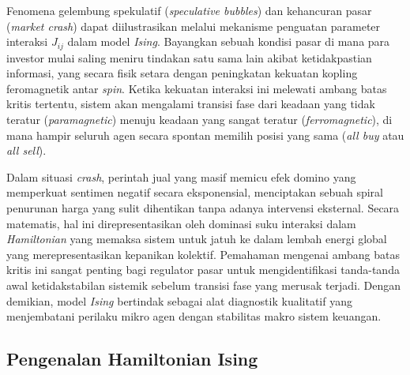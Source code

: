 \begin{example}
    Fenomena gelembung spekulatif (\textit{speculative bubbles}) dan kehancuran pasar (\textit{market crash}) dapat diilustrasikan melalui mekanisme penguatan parameter interaksi $J_{ij}$ dalam model \textit{Ising}. Bayangkan sebuah kondisi pasar di mana para investor mulai saling meniru tindakan satu sama lain akibat ketidakpastian informasi, yang secara fisik setara dengan peningkatan kekuatan kopling feromagnetik antar \textit{spin}. Ketika kekuatan interaksi ini melewati ambang batas kritis tertentu, sistem akan mengalami transisi fase dari keadaan yang tidak teratur (\textit{paramagnetic}) menuju keadaan yang sangat teratur (\textit{ferromagnetic}), di mana hampir seluruh agen secara spontan memilih posisi yang sama (\textit{all buy} atau \textit{all sell}).

    Dalam situasi \textit{crash}, perintah jual yang masif memicu efek domino yang memperkuat sentimen negatif secara eksponensial, menciptakan sebuah spiral penurunan harga yang sulit dihentikan tanpa adanya intervensi eksternal. Secara matematis, hal ini direpresentasikan oleh dominasi suku interaksi dalam \textit{Hamiltonian} yang memaksa sistem untuk jatuh ke dalam lembah energi global yang merepresentasikan kepanikan kolektif. Pemahaman mengenai ambang batas kritis ini sangat penting bagi regulator pasar untuk mengidentifikasi tanda-tanda awal ketidakstabilan sistemik sebelum transisi fase yang merusak terjadi. Dengan demikian, model \textit{Ising} bertindak sebagai alat diagnostik kualitatif yang menjembatani perilaku mikro agen dengan stabilitas makro sistem keuangan.
\end{example}

\subsection{Pengenalan Hamiltonian Ising}

